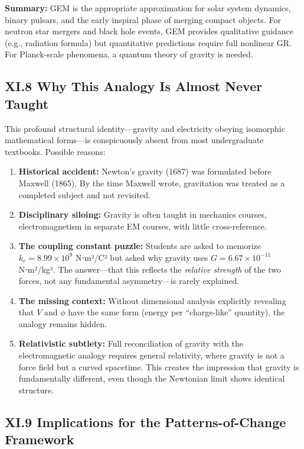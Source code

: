 \documentclass[
]{article}
\begin{document}
\textbf{Summary:} GEM is the appropriate approximation for solar system
dynamics, binary pulsars, and the early inspiral phase of merging
compact objects. For neutron star mergers and black hole events, GEM
provides qualitative guidance (e.g., radiation formula) but quantitative
predictions require full nonlinear GR. For Planck-scale phenomena, a
quantum theory of gravity is needed.

\subsection{XI.8 Why This Analogy Is Almost Never
Taught}\label{xi.8-why-this-analogy-is-almost-never-taught}

This profound structural identity---gravity and electricity obeying
isomorphic mathematical forms---is conspicuously absent from most
undergraduate textbooks. Possible reasons:

\begin{enumerate}
\def\labelenumi{\arabic{enumi}.}
\item
  \textbf{Historical accident:} Newton's gravity (1687) was formulated
  before Maxwell (1865). By the time Maxwell wrote, gravitation was
  treated as a completed subject and not revisited.
\item
  \textbf{Disciplinary siloing:} Gravity is often taught in mechanics
  courses, electromagnetism in separate EM courses, with little
  cross-reference.
\item
  \textbf{The coupling constant puzzle:} Students are asked to memorize
  \(k_e = 8.99 \times 10^9\) N⋅m²/C² but asked why gravity uses
  \(G = 6.67 \times 10^{-11}\) N⋅m²/kg². The answer---that this reflects
  the \emph{relative strength} of the two forces, not any fundamental
  asymmetry---is rarely explained.
\item
  \textbf{The missing context:} Without dimensional analysis explicitly
  revealing that \(V\) and \(\phi\) have the same form (energy per
  ``charge-like'' quantity), the analogy remains hidden.
\item
  \textbf{Relativistic subtlety:} Full reconciliation of gravity with
  the electromagnetic analogy requires general relativity, where gravity
  is not a force field but a curved spacetime. This creates the
  impression that gravity is fundamentally different, even though the
  Newtonian limit shows identical structure.
\end{enumerate}

\subsection{XI.9 Implications for the Patterns-of-Change
Framework}\label{xi.9-implications-for-the-patterns-of-change-framework}
\end{document}
